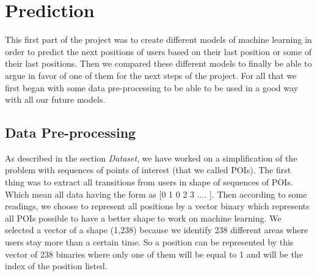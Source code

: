 \documentclass[a4]{article}
\begin{document}
\newpage
\section{Prediction}
This first part of the project was to create different models of machine learning in order to predict the next positions of users based on their last position or some of their last positions. Then we compared these different models to finally be able to argue in favor of one of them for the next steps of the project. For all that we first began with some data pre-processing to be able to be used in a good way with all our future models.

\subsection{Data Pre-processing}
As described in the section \textit{Dataset}, we have worked on a simplification of the problem with sequences of points of interest (that we called POIs). The first thing was to extract all transitions from users in shape of sequences of POIs. Which mean all data having the form as [0 1 0 2 3 .... ]. Then according to some readings, we choose to represent all positions by a vector binary which represents all POIs possible to have a better shape to work on machine learning. We selected a vector of a shape (1,238) because we identify 238 different areas where users stay more than a certain time. So a position can be represented by this vector of 238 binaries where only one of them will be equal to 1 and will be the index of the position listed. 
\end{document}
